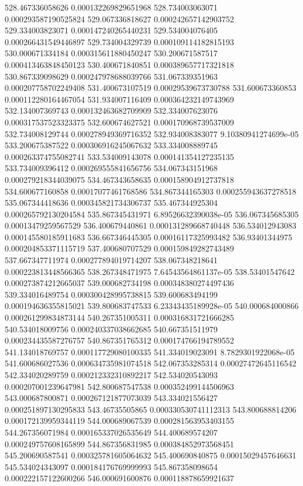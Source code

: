{528.467336058626 0.000132269829651968
528.734003063071 0.000293587190525824
529.067336818627 0.000242657142903752
529.334003823071 0.000147240265440231
529.534004076405 0.000266431549446897
529.734004329739 0.000109114182815193
530.000671334184 0.000315611880450247
530.200671587517 0.000413463848450123
530.400671840851 0.000389657717321818
530.867339098629 0.000247978688039766
531.067339351963 0.000207758702249408
531.400673107519 0.00029539673730788
531.600673360853 0.000112280164467054
531.934007116409 0.000364232149743969
532.134007369743 0.000132463682709909
532.334007623076 0.000317537523323375
532.600674627521 0.000170968739537009
532.734008129744 0.000278949369716352
532.934008383077 9.10380941274699e-05
533.200675387522 0.000306916245067632
533.334008889745 0.000263374755082741
533.534009143078 0.000141354127235135
533.734009396412 0.000269555841656756
534.067343151968 0.000279218344039075
534.467343658635 0.000158904912737818
534.600677160858 0.00017077461768586
534.867344165303 0.000255943637278518
535.067344418636 0.000345821734306737
535.467344925304 0.000265792130204584
535.867345431971 6.89526632390038e-05
536.067345685305 0.00013479259567529
536.400679440861 0.000131289668740448
536.534012943083 0.000145580185911683
536.667346445305 0.00016117325993482
536.93401344975 0.000204853371115719
537.400680707529 0.000159849282743489
537.667347711974 0.000277894019714207
538.067348218641 0.000223813448566365
538.267348471975 7.64543564861137e-05
538.53401547642 0.000273874212665037
539.000682734198 0.000348380274497436
539.334016489754 0.000300428995738815
539.600683494199 0.000194636355815021
539.800683747533 6.23343435189928e-05
540.000684000866 0.000261299834873144
540.267351005311 0.000316831721666285
540.534018009756 0.000240337038662685
540.667351511979 0.000234435587276757
540.867351765312 0.000174766194789552
541.134018769757 0.000117729080100335
541.334019023091 8.7829301922068e-05
541.600686027536 0.000634735981074518
542.067353285314 0.00027472645116542
542.334020289759 0.000212332310892217
542.534020543093 0.000207001239647981
542.800687547538 0.000352499144506963
543.000687800871 0.000267121877073039
543.334021556427 0.000251897130295833
543.46735505865 0.000330530741112313
543.800688814206 0.000172139959344119
544.000689067539 0.000281563953403155
544.267356071984 0.000165337026535649
544.400689574207 0.000249757608165899
544.867356831985 0.000384852973568451
545.200690587541 0.000325781605064632
545.400690840875 0.00015029457646631
545.534024343097 0.000184176769999993
545.867358098654 0.000222157122600266
546.000691600876 0.000118878659921637
}
